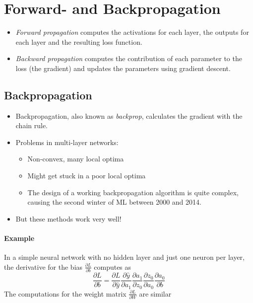 	\section{Forward- and Backpropagation}
		\begin{itemize}
			\item \emph{Forward propagation} computes the activations for each layer, the outputs for each layer and the resulting loss function.
			\item \emph{Backward propagation} computes the contribution of each parameter to the loss (the gradient) and updates the parameters using gradient descent.
		\end{itemize}

		\subsection{Backpropagation}
			\begin{itemize}
				\item Backpropagation, also known as \emph{backprop}, calculates the gradient with the chain rule.
				\item Problems in multi-layer networks:
					\begin{itemize}
						\item Non-convex, many local optima
						\item Might get stuck in a poor local optima
						\item The design of a working backpropagation algorithm is quite complex, causing the second winter of ML between 2000 and 2014.
					\end{itemize}
				\item But these methods work very well!
			\end{itemize}

			\paragraph{Example}
				In a simple neural network with no hidden layer and just one neuron per layer, the derivative for the bias \( \frac{\partial L}{\partial b} \) computes as
				\begin{equation}
					\frac{\partial L}{\partial b} = \frac{\partial L}{\partial \hat{y}} \frac{\partial \hat{y}}{\partial a_1} \frac{\partial a_1}{\partial z_0} \frac{\partial z_0}{\partial a_0} \frac{\partial a_0}{\partial b}
				\end{equation}
				The computations for the weight matrix \( \frac{\partial L}{\partial W} \) are similar

